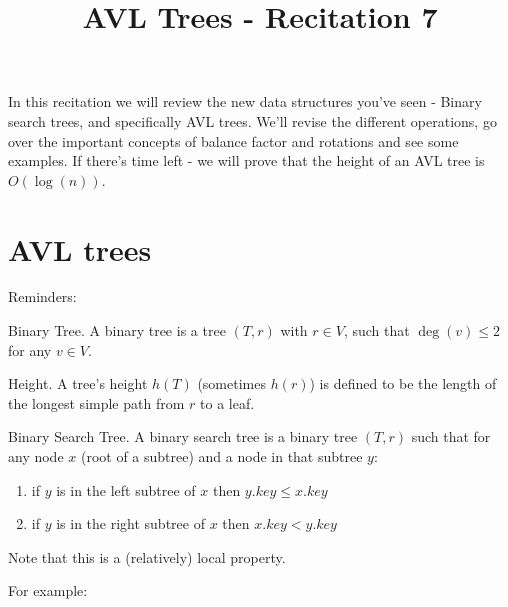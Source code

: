 \title{AVL Trees  - Recitation 7} 


    In this recitation we will review the new data structures you've seen - Binary
    search trees, and specifically AVL trees. We'll revise the different
    operations, go over the important concepts of balance factor and
    rotations and see some examples. If there's time left - we will prove
    that the height of an AVL tree is $O(\log(n))$.
    
\section{AVL trees}
    Reminders:
    \begin{defbox}{Binary Tree.}
        A binary tree is a tree $(T,r)$ with $r\in V$, such that $\deg(v)
            \leq 2$ for any $v\in V$.
    \end{defbox}
    \begin{defbox}{Height.} A tree's height $h(T)$ (sometimes $h(r)$) is defined to be the
    length of the
    longest
    simple path from $r$ to a leaf.
    \end{defbox}
    \begin{defbox}{ Binary Search Tree. } A binary search tree is a binary tree $(T,r)$ such that for any
    node $x$ (root of a subtree) and a node in that subtree $y$:
    \begin{enumerate}
        \item if $y$ is in the left subtree of $x$ then $y.key \leq x.key$
        \item if $y$ is in the right subtree of $x$ then $x.key < y.key$
    \end{enumerate}
        Note that this is a (relatively) local property.
    \end{defbox}
For example:\\
    \begin{center}
    \end{center}
